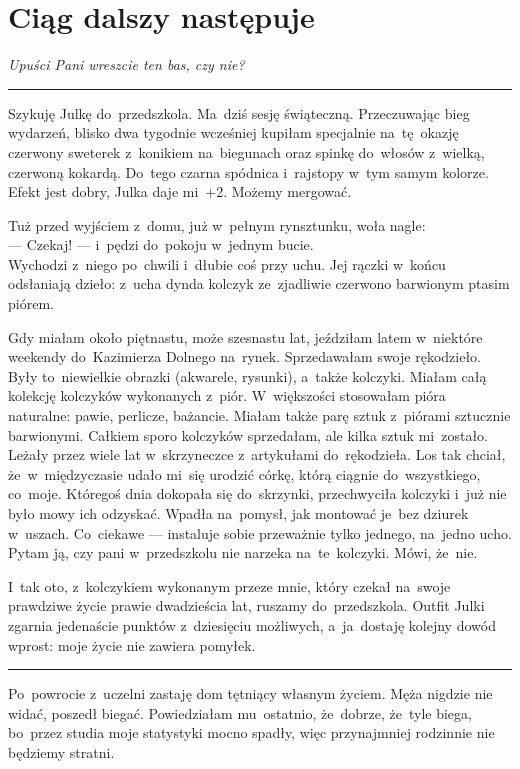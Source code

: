 \documentclass[9pt, a5paper]{memoir}
\begin{document}
\newpage
\section{Ciąg dalszy następuje}
{
\itshape
Upuści Pani wreszcie ten bas, czy nie?
}

\fancybreak{* \quad * \quad *}

Szykuję Julkę do~przedszkola. Ma~dziś sesję świąteczną. Przeczuwając bieg wydarzeń, blisko dwa tygodnie wcześniej kupiłam specjalnie na~tę~okazję czerwony sweterek z~konikiem na~biegunach oraz spinkę do~włosów z~wielką, czerwoną kokardą. Do~tego czarna spódnica i~rajstopy w~tym samym kolorze. Efekt jest dobry, Julka daje mi~+2. Możemy mergować.

Tuż przed wyjściem z~domu, już w~pełnym rynsztunku, woła nagle:\\
--- Czekaj! --- i~pędzi do~pokoju w~jednym bucie.\\
Wychodzi z~niego po~chwili i~dłubie coś przy uchu. Jej rączki w~końcu odsłaniają dzieło: z~ucha dynda kolczyk ze~zjadliwie czerwono barwionym ptasim piórem.

Gdy miałam około piętnastu, może szesnastu lat, jeździłam latem w~niektóre weekendy do~Kazimierza Dolnego na~rynek. Sprzedawałam swoje rękodzieło. Były to~niewielkie obrazki (akwarele, rysunki), a~także kolczyki. Miałam całą kolekcję kolczyków wykonanych z~piór. W~większości stosowałam pióra naturalne: pawie, perlicze, bażancie. Miałam także parę sztuk z~piórami sztucznie barwionymi. Całkiem sporo kolczyków sprzedałam, ale kilka sztuk mi~zostało. Leżały przez wiele lat w~skrzyneczce z~artykułami do~rękodzieła. Los tak chciał, że~w~międzyczasie udało mi~się urodzić córkę, którą ciągnie do~wszystkiego, co~moje. Któregoś dnia dokopała się do~skrzynki, przechwyciła kolczyki i~już nie było mowy ich odzyskać. Wpadła na~pomysł, jak montować je~bez dziurek w~uszach. Co~ciekawe --- instaluje sobie przeważnie tylko jednego, na~jedno ucho. Pytam ją, czy pani w~przedszkolu nie narzeka na~te~kolczyki. Mówi, że~nie.

I~tak oto, z~kolczykiem wykonanym przeze mnie, który czekał na~swoje prawdziwe życie prawie dwadzieścia lat, ruszamy do~przedszkola. Outfit Julki zgarnia jedenaście punktów z~dziesięciu możliwych, a~ja~dostaję kolejny dowód wprost: moje życie nie zawiera pomyłek.

\fancybreak{* \quad * \quad *}

Po~powrocie z~uczelni zastaję dom tętniący własnym życiem. Męża nigdzie nie widać, poszedł biegać. Powiedziałam mu~ostatnio, że~dobrze, że~tyle biega, bo~przez studia moje statystyki mocno spadły, więc przynajmniej rodzinnie nie będziemy stratni.
\end{document}
